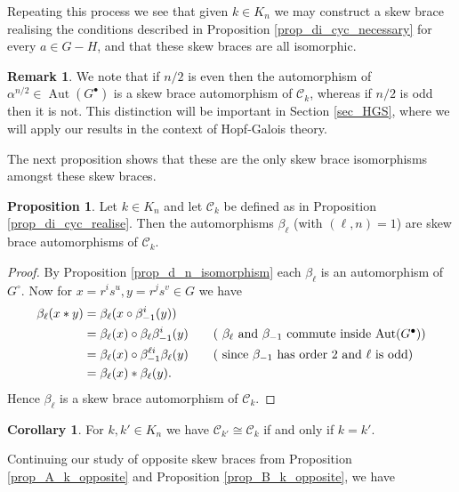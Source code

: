 \documentclass[reqno]{amsart}
\theoremstyle{definition}
\newtheorem{proposition}[theorem]{Proposition}
\newtheorem{corollary}[theorem]{Corollary}
\newtheorem{remark}[theorem]{Remark}
\DeclareMathOperator{\Aut}{\mbox{Aut}}
\begin{document}
Repeating this process we see that given $ k \in K_{n} $ we may construct a skew brace realising the conditions described in Proposition \ref{prop_di_cyc_necessary} for every $ a \in G - H $, and that these skew braces are all isomorphic. 

\begin{remark} \label{rmk_C_k_alpha_2}
We note that if $ n/2 $ is even then the automorphism of $ \alpha^{n/2} \in \Aut(G^{\bullet}) $ is a skew brace automorphism of $ \mathscr{C}_{k} $, whereas if $ n/2 $ is odd then it is not. This distinction will be important in Section \ref{sec_HGS}, where we will apply our results in the context of Hopf-Galois theory. 
\end{remark}

The next proposition shows that these are the only skew brace isomorphisms amongst these skew braces. 

\begin{proposition} \label{prop_di_cyc_isomorphism_2}
Let $ k \in K_{n} $ and let $ \mathscr{C}_{k} $ be defined as in Proposition \ref{prop_di_cyc_realise}. Then the automorphisms $ \beta_{\ell} $ (with $ (\ell,n)=1 $) are skew brace automorphisms of $ \mathscr{C}_{k} $. 
\end{proposition}
\begin{proof}
By Proposition \ref{prop_d_n_isomorphism} each $ \beta_{\ell} $ is an automorphism of $ G^{\circ} $. Now for $ x=r^{i}s^{u}, y=r^{j}s^{v} \in G $ we have
\begin{align*}
\beta_{\ell}(x \ast y) &= \beta_{\ell}( x \circ \beta_{-1}^{i}(y) ) \\
&= \beta_{\ell}(x) \circ \beta_{\ell}\beta_{-1}^{i}(y) \tag{ $ \beta_{\ell} $ and $ \beta_{-1} $ commute inside $ \Aut(G^{\bullet}) $}\\
&= \beta_{\ell}(x) \circ \beta_{-1}^{\ell i}\beta_{\ell}(y) \tag{ since $ \beta_{-1} $ has order $ 2 $ and $ \ell $ is odd} \\
&= \beta_{\ell}(x) \ast \beta_{\ell}(y).
\end{align*}
Hence $ \beta_{\ell} $ is a skew brace automorphism of $ \mathscr{C}_{k} $.
\end{proof}

\begin{corollary}
For $ k,k' \in K_{n} $ we have $ \mathscr{C}_{k'} \cong \mathscr{C}_{k} $ if and only if $ k = k' $. 
\end{corollary}

Continuing our study of opposite skew braces from Proposition \ref{prop_A_k_opposite} and Proposition \ref{prop_B_k_opposite}, we have
\end{document}
